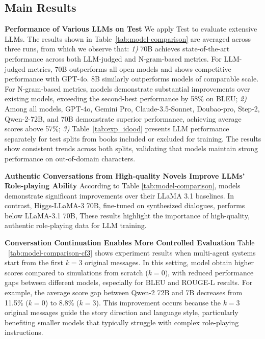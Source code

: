 \subsection{Main Results}



\textbf{Performance of Various LLMs on \method Test} \quad 
We apply \method Test to evaluate extensive LLMs. 
The results shown in Table~\ref{tab:model-comparison} are  averaged across three runs, from which we observe that: 
\textit{1)} \method 70B achieves state-of-the-art performance across both LLM-judged  and N-gram-based metrics. 
For LLM-judged metrics, \method 70B outperforms all open models and shows competitive performance with GPT-4o. \method 8B similarly outperforms models of comparable scale.
For N-gram-based metrics, \method models demonstrate substantial improvements over existing models, exceeding the second-best performance by 58\% on BLEU; 
\textit{2)} Among all models, GPT-4o, Gemini Pro, Claude-3.5-Sonnet, Doubao-pro, Step-2, Qwen-2-72B, and \method 70B demonstrate superior performance, achieving average scores above 57\%; 
\textit{3)} Table~\ref{tab:exp_idood} presents LLM performance separately for test splits from books included or excluded for  \method training. 
The results show consistent trends across both splits, validating that \method models maintain strong performance on out-of-domain characters. 

\textbf{Authentic Conversations from High-quality Novels Improve LLMs' Role-playing Ability} \quad 
According to Table \ref{tab:model-comparison}, 
\method models demonstrate significant improvements over their LLaMA 3.1 baselines.
In contrast, Higgs-LLaMA-3 70B, fine-tuned on synthesized dialogues, performs below LLaMA-3.1 70B,
These results highlight the importance of high-quality, authentic role-playing data for LLM training. 

\textbf{Conversation Continuation Enables More Controlled Evaluation} \quad 
Table ~\ref{tab:model-comparison-cf3} shows experiment results when multi-agent systems start from the first $k=3$ original messages.  
In this setting, model obtain higher scores compared to simulations from scratch ($k=0$), with reduced performance gaps between different models, especially for BLEU and ROUGE-L results. 
For example, the average score gap between Qwen-2 72B and 7B decreases from 11.5\% ($k=0$) to 8.8\% ($k=3$).
This improvement occurs because the $k=3$ original messages guide the story direction and language style, particularly benefiting smaller models that typically struggle with complex role-playing instructions. 


